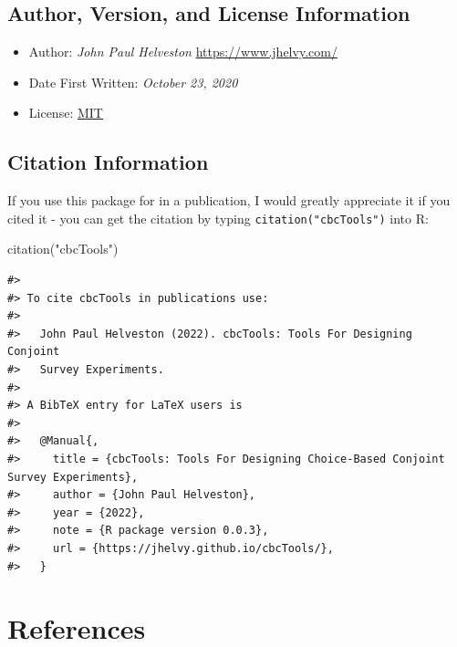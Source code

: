 \documentclass[
  12pt,
]{article}
\newenvironment{Shaded}{\begin{snugshade}}{\end{snugshade}}
\newcommand{\FunctionTok}[1]{\textcolor[rgb]{0.00,0.00,0.00}{#1}}
\newcommand{\NormalTok}[1]{#1}
\newcommand{\StringTok}[1]{\textcolor[rgb]{0.31,0.60,0.02}{#1}}
\providecommand{\tightlist}{%
  \setlength{\itemsep}{0pt}\setlength{\parskip}{0pt}}
\begin{document}
\hypertarget{author-version-and-license-information}{%
\subsection{Author, Version, and License
Information}\label{author-version-and-license-information}}

\begin{itemize}
\tightlist
\item
  Author: \emph{John Paul Helveston} \url{https://www.jhelvy.com/}
\item
  Date First Written: \emph{October 23, 2020}
\item
  License:
  \href{https://github.com/jhelvy/cbcTools/blob/master/LICENSE.md}{MIT}
\end{itemize}

\hypertarget{citation-information}{%
\subsection{Citation Information}\label{citation-information}}

If you use this package for in a publication, I would greatly appreciate
it if you cited it - you can get the citation by typing
\texttt{citation("cbcTools")} into R:

\begin{Shaded}
\begin{Highlighting}[]
\FunctionTok{citation}\NormalTok{(}\StringTok{"cbcTools"}\NormalTok{)}
\end{Highlighting}
\end{Shaded}

\begin{verbatim}
#> 
#> To cite cbcTools in publications use:
#> 
#>   John Paul Helveston (2022). cbcTools: Tools For Designing Conjoint
#>   Survey Experiments.
#> 
#> A BibTeX entry for LaTeX users is
#> 
#>   @Manual{,
#>     title = {cbcTools: Tools For Designing Choice-Based Conjoint Survey Experiments},
#>     author = {John Paul Helveston},
#>     year = {2022},
#>     note = {R package version 0.0.3},
#>     url = {https://jhelvy.github.io/cbcTools/},
#>   }
\end{verbatim}

\hypertarget{references}{%
\section*{References}\label{references}}
\end{document}
